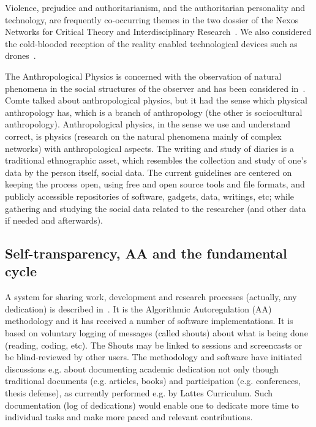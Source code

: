 \documentclass[letterpaper,10pt]{article}
\begin{document}
Violence, prejudice and authoritarianism,
and the authoritarian personality and technology,
are frequently co-occurring themes in the two dossier of the
Nexos Networks for Critical Theory and Interdisciplinary Research~\cite{nexos1}.
We also considered the cold-blooded reception of the reality
enabled technological devices such as drones~\cite{drones}.

The Anthropological Physics is concerned
with the observation of natural
phenomena in the social structures
of the observer and has been
considered in~\cite{an,an2,tese}.
Comte talked about anthropological physics,
but it had the sense which physical
anthropology has, which is a branch of anthropology
(the other is sociocultural anthropology).
Anthropological physics, in the sense we use and understand correct,
is physics (research on the natural phenomena mainly of complex networks)
with anthropological aspects.
The writing and study of diaries is a traditional ethnographic asset,
which resembles the collection and study of one's data by the person itself,
social data.
The current guidelines are centered on keeping the process open,
using free and open source tools and file formats,
and publicly accessible repositories of software, gadgets, data, writings, etc;
while gathering and studying the social data related to the researcher
(and other data if needed and afterwards).~\cite{an,an2,imp,tese}



\subsection{Self-transparency, AA and the fundamental cycle}\label{self}
A system for sharing work, development and research processes
(actually, any dedication)
is described in~\cite{aa,aa2}.
It is the Algorithmic Autoregulation (AA) methodology and it has
received a number of software implementations.
It is based on voluntary logging of messages (called shouts)
about what is being done (reading, coding, etc).
The Shouts may
be linked to sessions and screencasts or be blind-reviewed
by other users.
The methodology and software have initiated discussions
e.g. about documenting academic dedication not only though
traditional documents (e.g. articles, books) and participation (e.g. conferences, thesis defense),
as currently performed e.g. by Lattes Curriculum.
Such documentation (log of dedications)
would enable one to dedicate more time to individual
tasks and make more paced and relevant contributions.
\end{document}
